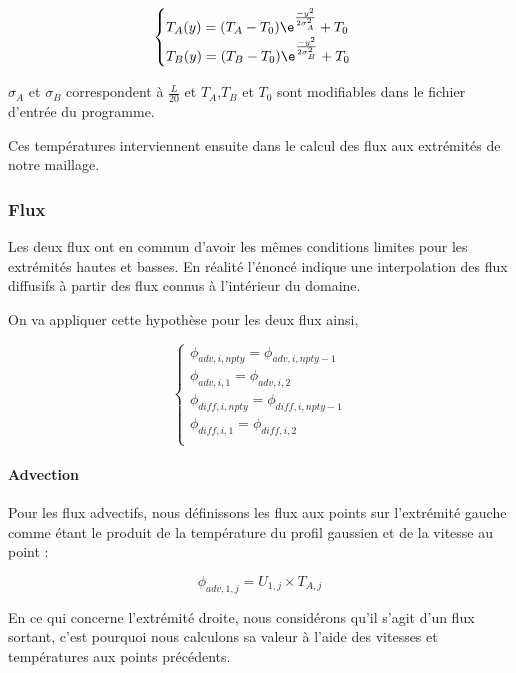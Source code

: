 \documentclass[a4paper,oneside]{article}
\begin{document}
\begin{equation*}
\begin{cases}
T_{A}(y)=(T_A - T_0)\e^{\frac{-y^2}{2\sigma_A^2}} +T_0\\
T_{B}(y)= (T_B - T_0)\e^{\frac{-y^2}{2\sigma_B^2}} +T_0\\
\end{cases}
\end{equation*}

$\sigma_A$ et $\sigma_B$ correspondent à $\frac{L}{20}$ et $T_A$,$T_B$ et $T_0$ sont modifiables dans le fichier d'entrée du programme.

Ces températures interviennent ensuite dans le calcul des flux aux extrémités de notre maillage.

\subsubsection{Flux}

Les deux flux ont en commun d'avoir les mêmes conditions limites pour les extrémités hautes et basses.
En réalité l'énoncé indique une interpolation des flux diffusifs à partir des flux connus à l'intérieur du domaine.

On va appliquer cette hypothèse pour les deux flux ainsi, 

\begin{equation*}
	\begin{cases}		
	\phi_{adv,i,npty} = \phi_{adv,i,npty-1}\\
	\phi_{adv,i,1} = \phi_{adv,i,2}\\
	\phi_{diff,i,npty} = \phi_{diff,i,npty-1}\\
	\phi_{diff,i,1} = \phi_{diff,i,2}\\
	\end{cases}
\end{equation*}

\paragraph{Advection}
Pour les flux advectifs, nous définissons les flux aux points sur l'extrémité gauche comme étant le produit de la température du profil gaussien et de la vitesse au point :

\[
 \phi_{adv,1,j} =U_{1,j}\times T_{A,j}
\]


En ce qui concerne l'extrémité droite, nous considérons qu'il s'agit d'un flux sortant, c'est pourquoi nous calculons sa valeur à l'aide des vitesses et températures aux points précédents.
  
\end{document}
